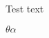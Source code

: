 \documentclass[UTF8]{ctexart}
\begin{document}
	Test text	
	
$
	\theta
	
	\alpha
	$
	
\end{document}
